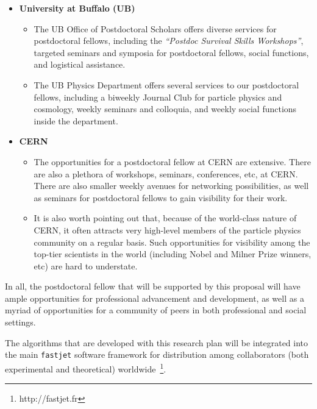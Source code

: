 \documentclass[times,11pt]{article}
\begin{document}
\begin{itemize}
\item {\bf University at Buffalo (UB)}
\begin{itemize}
\item The UB Office of Postdoctoral Scholars offers diverse services
  for postdoctoral fellows, including the {\sl ``Postdoc Survival
    Skills Workshops''}, targeted seminars and symposia for
  postdoctoral fellows, social functions, and logistical assistance. 
\item The UB Physics Department offers several services to our
  postdoctoral fellows, including a biweekly Journal Club for particle
  physics and cosmology, weekly seminars and colloquia, and weekly
  social functions inside the department. 
\end{itemize}
\item {\bf CERN}
\begin{itemize}
\item The opportunities for a postdoctoral fellow at CERN
  are extensive. There are also a plethora of workshops,
  seminars, conferences, etc, at CERN. There are also smaller weekly
  avenues for networking possibilities, as well as seminars for
  postdoctoral fellows to gain visibility for their work. 
\item It is also worth pointing out that, because of the world-class
  nature of CERN, it often attracts very high-level members of the
  particle physics community on a regular basis. Such opportunities
  for visibility among the top-tier scientists in the world (including
  Nobel and Milner Prize winners, etc) are hard to understate. 
\end{itemize}
\end{itemize}

In all, the postdoctoral fellow that will be supported by this
proposal will have ample opportunities for professional advancement
and development, as well as a myriad of opportunities for a community
of peers in both professional and social settings. 



\newpage
{}
\renewcommand{\thepage} {E--\arabic{page}}

The algorithms that are developed with this research plan will be
integrated into the main {\tt fastjet} software framework for
distribution among collaborators (both experimental and theoretical)
worldwide~\footnote{http://fastjet.fr}. 
\end{document}
